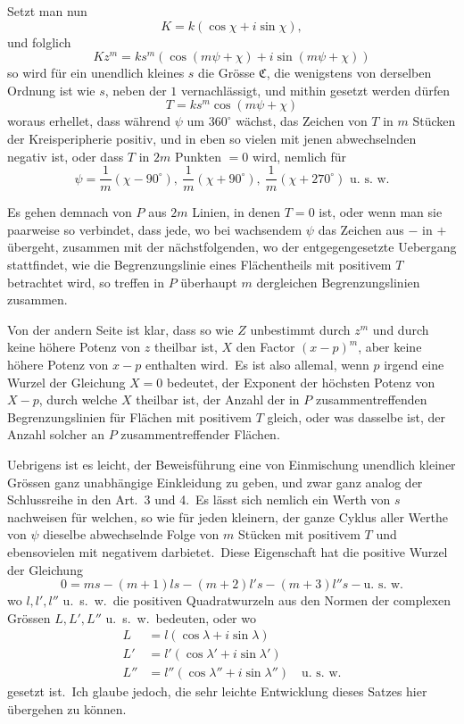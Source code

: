 \documentclass[12pt,a4paper]{article}
\theoremstyle{plain}
\begin{document}
Setzt man nun
\[
K = k(\cos\chi + i \sin\chi),
\]
und folglich
\[
Kz^m = ks^m(\cos(m\psi + \chi) + i \sin(m\psi + \chi))
\]
so wird für ein unendlich kleines $s$ die Grösse $\mathfrak{C}$, die wenigstens von derselben
Ordnung ist wie $s$, neben der $1$ vernachlässigt, und mithin gesetzt werden dürfen
\[
T = ks^m \cos(m\psi + \chi)
\]
woraus erhellet, dass während $\psi$ um $360^\circ$ wächst, das Zeichen von $T$ in $m$
Stücken der Kreisperipherie positiv, und in eben so vielen mit jenen abwechselnden negativ ist, oder dass $T$ in $2m$ Punkten $= 0$ wird, nemlich für
\[
\psi = \frac{1}{m}(\chi - 90^\circ),\ \frac{1}{m}(\chi + 90^\circ),\ \frac{1}{m}(\chi + 270^\circ) \text{ u.\ s.\ w.}
\]

Es gehen demnach von $P$ aus $2m$ Linien, in denen $T = 0$ ist, oder wenn man sie paarweise so verbindet, dass jede, wo bei wachsendem $\psi$ das Zeichen aus $-$ in $+$ übergeht, zusammen mit der nächstfolgenden, wo der entgegengesetzte Uebergang stattfindet, wie die Begrenzungslinie eines Flächentheils mit positivem $T$ betrachtet wird, so treffen in $P$ überhaupt $m$ dergleichen Begrenzungslinien zusammen.

Von der andern Seite ist klar, dass so wie $Z$ unbestimmt durch $z^m$ und
durch keine höhere Potenz von $z$ theilbar ist, $X$ den Factor $(x-p)^m$, aber keine
höhere Potenz von $x - p$ enthalten wird.\ Es ist also allemal, wenn $p$ irgend
eine Wurzel der Gleichung $X = 0$ bedeutet, der Exponent der höchsten Potenz von $X - p$, durch welche $X$ theilbar ist, der Anzahl der in $P$ zusammentreffenden Begrenzungslinien für Flächen mit positivem $T$ gleich, oder was dasselbe ist, der Anzahl solcher an $P$ zusammentreffender Flächen.

Uebrigens ist es leicht, der Beweisführung eine von Einmischung unendlich
kleiner Grössen ganz unabhängige Einkleidung zu geben, und zwar ganz analog
der Schlussreihe in den Art.\ 3 und 4.\ Es lässt sich nemlich ein Werth von $s$ nachweisen für
welchen, so wie für jeden kleinern, der ganze Cyklus aller Werthe
von $\psi$ dieselbe abwechselnde Folge von $m$ Stücken mit positivem $T$ und ebensovielen mit negativem darbietet.\ Diese Eigenschaft hat die positive Wurzel der
Gleichung
\[
0 = ms - (m+1)ls - (m+2)l's - (m+3)l''s - \text{u.\ s.\ w.}
\]
wo $l, l', l''$ u.\ s.\ w.\ die positiven Quadratwurzeln aus den Normen der complexen Grössen $L, L', L''$ u.\ s.\ w.\ bedeuten, oder wo
\begin{align*}
L &= l(\cos\lambda + i \sin\lambda) \\
L' &= l'(\cos\lambda' + i \sin\lambda') \\
L'' &= l''(\cos\lambda'' + i \sin\lambda'') \quad \text{u.\ s.\ w.}
\end{align*}
gesetzt ist.\ Ich glaube jedoch, die sehr leichte Entwicklung dieses Satzes hier
übergehen zu können.
\end{document}
